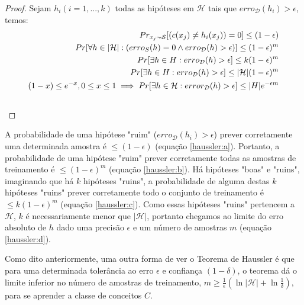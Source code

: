 \documentclass[
10pt, %
a4paper, %
onecolumn, %
]{article}
\begin{document}
\bigskip

\noindent{}

  \begin{proof}  Sejam $h_i (i = 1, ..., k)$ todas as hipóteses em $\mathcal{H}$ tais que $erro_{\mathcal{D}}(h_i)>\epsilon$, temos:
    \begin{align}
        Pr_{x_j\sim\mathcal{S}}[(c(x_j) \neq h_i(x_j))=0] \leq (1-\epsilon) \label{haussler:a} \\
        Pr[\forall h \in |\mathcal{H}|: (erro_{S}(h)=0 \land erro_{\mathcal{D}}(h)> \epsilon)] \leq (1-\epsilon)^m \label{haussler:b} \\
        Pr[\exists h \in H: erro_{\mathcal{D}}(h)>\epsilon]\leq k (1-\epsilon)^m \label{haussler:c} \\
        Pr[\exists h \in H: erro_{\mathcal{D}}(h)>\epsilon]\leq |\mathcal{H}| (1-\epsilon)^m \label{haussler:d} \\ 
        (1-x) \leq e^{-x}, 0 \leq x \leq 1 \implies Pr[\exists h \in \mathcal{H}: error_{\mathcal{D}}(h)>\epsilon]\leq |H|e^{-\epsilon m}  \label{haussler:e} \\
        \qedhere
    \end{align}
    \end{proof}

A probabilidade de uma hipótese "ruim" ($erro_{\mathcal{D}}(h_i)>\epsilon$) prever corretamente uma determinada amostra é $\leq (1-\epsilon)$ (equação \ref{haussler:a}). Portanto, a probabilidade de uma hipótese "ruim" prever corretamente todas as amostras de treinamento é  $\leq (1-\epsilon)^m$ (equação \ref{haussler:b}). Há hipóteses "boas" e "ruins", imaginando que há $k$ hipóteses "ruins", a probabilidade de alguma destas $k$ hipóteses "ruins" prever corretamente todo o conjunto de treinamento é $\leq k (1-\epsilon)^m$ (equação \ref{haussler:c}). Como essas hipóteses "ruins" pertencem a $\mathcal{H}$, $k$ é necessariamente menor que $|\mathcal{H}|$, portanto chegamos ao limite do erro absoluto de $h$ dado uma precisão $\epsilon$  e um número de amostras $m$ (equação \ref{haussler:d}).

Como dito anteriormente, uma outra forma de ver o Teorema de Haussler é que para uma determinada tolerância ao erro $\epsilon$ e confiança $(1-\delta)$, o teorema dá o limite inferior no número de amostras de treinamento, $m \geq \frac{1}{\epsilon}(\ln{|\mathcal{H}|}+\ln{\frac{1}{\delta}})$,  para se aprender a classe de conceitos $C$.
\end{document}
